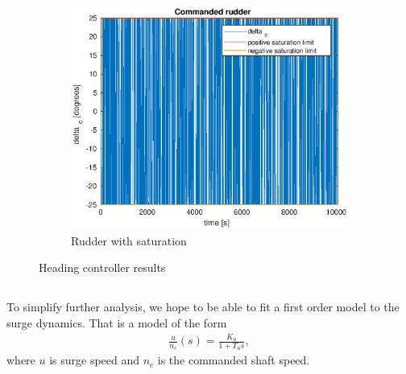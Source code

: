 \begin{figure}[ht]
\begin{subfigure}[b]{0.3\textwidth}
		\includegraphics[width=\textwidth]{rudder1_4}
		\caption{Rudder with saturation}
		\label{fig:rudder1_4}
	\end{subfigure}
	\caption{Heading controller results}\label{fig:2}
\end{figure}

\subsection{}
To simplify further analysis, we hope to be able to fit a first order model to the surge dynamics. That is a model of the form
\begin{equation}\begin{aligned}
\frac{u}{n_c}(s) = \frac{K_u}{1 + T_u s},
\end{aligned}\end{equation}
where $u$ is surge speed and $n_c$ is the commanded shaft speed.


